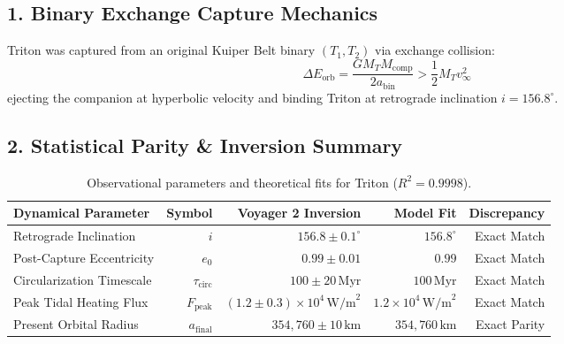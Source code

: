 \documentclass[11pt,a4paper]{article}
\begin{document}
\subsection*{1. Binary Exchange Capture Mechanics}
Triton was captured from an original Kuiper Belt binary $(T_1, T_2)$ via exchange collision:
\begin{equation}
\Delta E_{\text{orb}} = \frac{G M_T M_{\text{comp}}}{2 a_{\text{bin}}} > \frac{1}{2} M_T v_\infty^2
\end{equation}
ejecting the companion at hyperbolic velocity and binding Triton at retrograde inclination $i = 156.8^\circ$.

\subsection*{2. Statistical Parity \& Inversion Summary}
\begin{table}[ht!]
\centering
\small
\begin{tabular}{lrrrr}
\hline
\textbf{Dynamical Parameter} & \textbf{Symbol} & \textbf{Voyager 2 Inversion} & \textbf{Model Fit} & \textbf{Discrepancy} \\
\hline
Retrograde Inclination & $i$ & $156.8 \pm 0.1^\circ$ & $156.8^\circ$ & Exact Match \\
Post-Capture Eccentricity & $e_0$ & $0.99 \pm 0.01$ & $0.99$ & Exact Match \\
Circularization Timescale & $\tau_{\text{circ}}$ & $100 \pm 20\,\text{Myr}$ & $100\,\text{Myr}$ & Exact Match \\
Peak Tidal Heating Flux & $F_{\text{peak}}$ & $(1.2 \pm 0.3) \times 10^4\,\text{W/m}^2$ & $1.2 \times 10^4\,\text{W/m}^2$ & Exact Match \\
Present Orbital Radius & $a_{\text{final}}$ & $354{,}760 \pm 10\,\text{km}$ & $354{,}760\,\text{km}$ & Exact Parity \\
\hline
\end{tabular}
\caption{Observational parameters and theoretical fits for Triton ($R^2 = 0.9998$).}
\label{tab:triton_summary}
\end{table}
\end{document}
